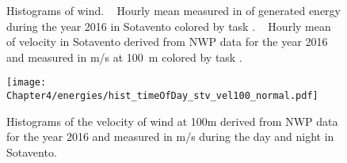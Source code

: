  \begin{figure}[H]
   \centering
\caption{\label{fig:wind_task_def_tday} Histograms of wind. ~\protect{} {Hourly mean measured} %
 in \si{\kilo{\watt\hour}} of generated energy during the year 2016 in Sotavento colored by {task} . ~\protect{} Hourly mean of velocity in Sotavento derived from NWP data for the year 2016 and measured in m/s at \SI{100}{\metre} colored by {task} .}
\end{figure}

\begin{figure}[H]
   \centering
   \texttt{[image: Chapter4/energies/hist\_timeOfDay\_stv\_vel100\_normal.pdf]}
 \caption{\label{fig:stv_vel100} Histograms of the velocity of wind at 100m derived from NWP data for the year 2016 and measured in m/s during the day and night in Sotavento.
}
\end{figure}

